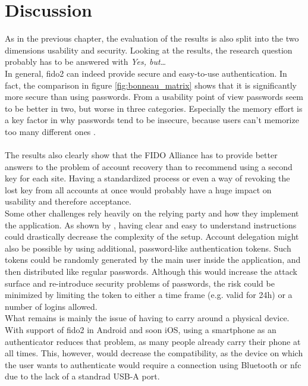 
\section{Discussion}
\label{sec:discussion}

As in the previous chapter, the evaluation of the results is also split into the two dimensions usability and security.
Looking at the results, the research question probably has to be answered with \emph{Yes, but\dots}\\
In general, \ac{fido2} can indeed provide secure and easy-to-use authentication. In fact, the comparison in figure \ref{fig:bonneau_matrix} shows that it is significantly more secure than using passwords. From a usability point of view passwords seem to be better in two, but worse in three categories. Especially the memory effort is a key factor in why passwords tend to be insecure, because users can't memorize too many different ones \cite{lyastani2018,elhai2016,whitty2015}.\\
\\
The results also clearly show that the FIDO Alliance has to provide better answers to the problem of account recovery than to recommend using a second key for each site. Having a standardized process or even a way of revoking the lost key from all accounts at once would probably have a huge impact on usability and therefore acceptance.\\
Some other challenges rely heavily on the relying party and how they implement the application. As shown by \cite{das2018}, having clear and easy to understand instructions could drastically decrease the complexity of the setup. Account delegation might also be possible by using additional, password-like authentication tokens. Such tokens could be randomly generated by the main user inside the application, and then distributed like regular passwords. Although this would increase the attack surface and re-introduce security problems of passwords, the risk could be minimized by limiting the token to either a time frame (e.g. valid for 24h) or a number of logins allowed.\\
What remains is mainly the issue of having to carry around a physical device. With support of \ac{fido2} in Android and soon iOS, using a smartphone as an authenticator reduces that problem, as many people already carry their phone at all times. This, however, would decrease the compatibility, as the device on which the user wants to authenticate would require a connection using Bluetooth or \ac{nfc} due to the lack of a standrad USB-A port.

